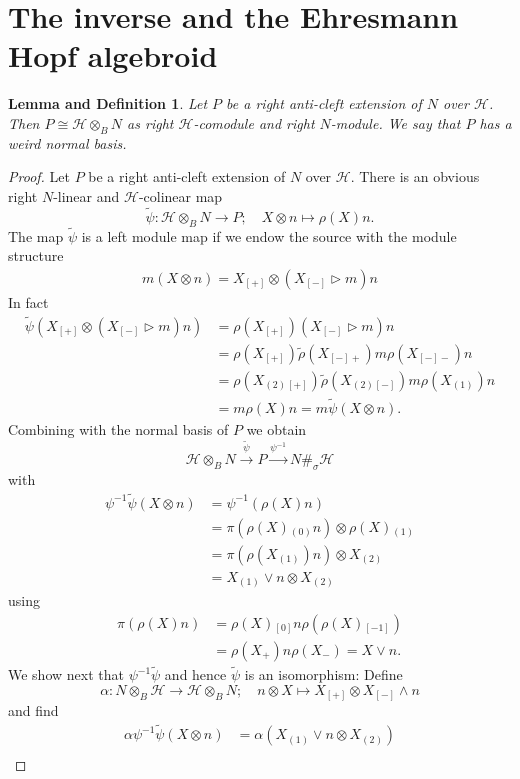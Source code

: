 \documentclass[a4paper,reqno]{amsart}
\numberwithin{equation}{section}
\theoremstyle{plain}
\newtheorem{LD}[thm]{Lemma and Definition}
\theoremstyle{remark}
\numberwithin{equation}{section}
\newcommand\inv{^{-1}}
\newcommand{\ot}{\otimes}
\newcommand{\trho}{{\tilde{\rho}}}
\newcommand{\z}{{}_{\scriptscriptstyle{(0)}}}
\newcommand{\rz}{{}_{\scriptscriptstyle{[0]}}}
\renewcommand{\o}{{}_{\scriptscriptstyle{(1)}}}
\newcommand{\rmo}{{}_{\scriptscriptstyle{[-1]}}}
\renewcommand{\t}{{}_{\scriptscriptstyle{(2)}}}
\newcommand\ou[1]{\otimes_{#1}}
\newcommand{\la}{{\triangleright}}
\newcommand{\CH}{\mathcal{H}}
\begin{document}
\section{The inverse and the Ehresmann Hopf algebroid}

\begin{LD}
   Let $P$ be a right anti-cleft extension of $N$ over $\CH$. Then $P\cong\CH\ot_{B}N$ as right $\CH$-comodule and right $N$-module. We say that $P$ has a weird normal basis.
\end{LD}
\begin{proof}
Let $P$ be a right anti-cleft extension of $N$ over $\CH$. There is an obvious right $N$-linear and $\CH$-colinear map 
\[\tilde\psi\colon\CH\ou BN\to P;\quad X\ot n\mapsto\rho(X)n.\]
The map $\tilde\psi$ is a left module map if we endow the source with the module structure
\begin{align}\label{equ. left N module structure on weird product}
    m(X\ot n)=X_{[+]}\ot(X_{[-]}\la m)n
\end{align}
In fact 
\begin{align*}
    \tilde\psi(X_{[+]}\ot(X_{[-]}\la m)n)
    &=\rho(X_{[+]})(X_{[-]}\la m)n\\
    &=\rho(X_{[+]})\trho(X_{[-]+})m\rho(X_{[-]-})n\\
    &=\rho(X\t{}_{[+]})\trho(X\t{}_{[-]})m\rho(X\o)n\\
    &=m\rho(X)n=m\tilde\psi(X\ot n).
\end{align*}
Combining with the normal basis of $P$ we obtain 
\[\CH\ou BN\xrightarrow{\tilde\psi}P\xrightarrow{\psi\inv} N\#_\sigma \CH\]
with
\begin{align*}
    \psi\inv\tilde\psi(X\ot n)
    &=\psi\inv(\rho(X)n)\\
    &=\pi(\rho(X)\z n)\ot \rho(X)\o\\
    &=\pi(\rho(X\o)n)\ot X\t\\
    &=X\o\vee n\ot X\t
\end{align*}
using
\begin{align*}    \pi(\rho(X)n)&=\rho(X)\rz n\rho(\rho(X)\rmo)\\
    &=\rho(X_+)n\rho(X_-)=X\vee n.
\end{align*}
We show next that $\psi\inv\tilde\psi$ and hence $\tilde\psi$ is an isomorphism: Define
\[\alpha\colon N\ou B\CH\to \CH\ou BN;\quad n\ot X\mapsto X_{[+]}\ot X_{[-]}\wedge n \]
and find
\begin{align*}
    \alpha\psi\inv\tilde\psi(X\ot n)
    &=\alpha(X\o\vee n\ot  X\t)\\

\end{align*}
\end{proof}
\end{document}
